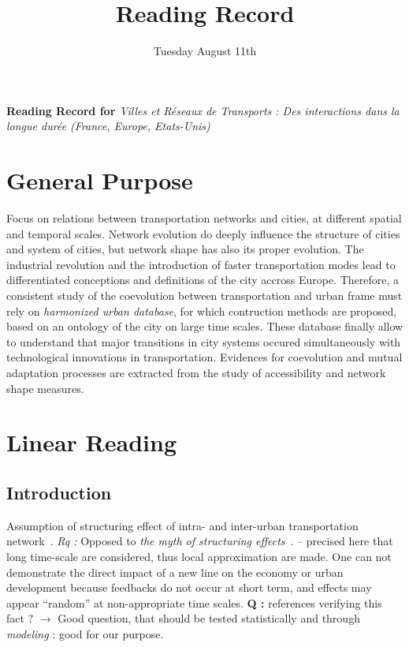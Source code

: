 


\title{Reading Record\bigskip\\
\textit{\cite{bretagnolle:tel-00459720}}
}
\author{}
\date{Tuesday August 11th}


\maketitle

\justify


\textbf{Reading Record for \cite{bretagnolle:tel-00459720}} \textit{Villes et R{\'e}seaux de Transports : Des interactions dans la longue dur{\'e}e (France, Europe, Etats-Unis)}


\section*{General Purpose}

Focus on relations between transportation networks and cities, at different spatial and temporal scales. Network evolution do deeply influence the structure of cities and system of cities, but network shape has also its proper evolution. The industrial revolution and the introduction of faster transportation modes lead to differentiated conceptions and definitions of the city accross Europe. Therefore, a consistent study of the coevolution between transportation and urban frame must rely on \emph{harmonized urban database}, for which contruction methods are proposed, based on an ontology of the city on large time scales. These database finally allow to understand that major transitions in city systems occured simultaneously with technological innovations in transportation. Evidences for coevolution and mutual adaptation processes are extracted from the study of accessibility and network shape measures.



\section{Linear Reading}


\subsection*{Introduction}


Assumption of structuring effect of intra- and inter-urban transportation network~\cite{bavoux2005geographie}. \textit{Rq :} Opposed to \emph{the myth of structuring effects}~\cite{offner1993effets}. -- precised here that long time-scale are considered, thus local approximation are made. One can not demonstrate the direct impact of a new line on the economy or urban development because feedbacks do not occur at short term, and effects may appear ``random'' at non-appropriate time scales. \textbf{Q : } references verifying this fact ? $\rightarrow$ Good question, that should be tested statistically and through \emph{modeling} : good for our purpose.

